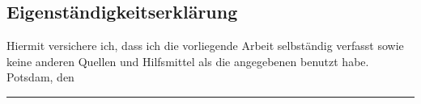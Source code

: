 \cleardoubleemptypage
\ifxetex
\begin{german}
\else
\begingroup
{}
\fi
  \setdatebynumber{\thedatenumber}
  \chapter*{Eigenständigkeitserklärung}
Hiermit versichere ich, dass ich die vorliegende Arbeit selbständig
verfasst sowie keine anderen Quellen und Hilfsmittel als die angegebenen
benutzt habe.\\[7\baselineskip]
%
  Potsdam, den \datedate \hfill \rule{.45\textwidth}{0.4pt}\par
%
  \raggedleft \makeatletter\@author\makeatother\par
\ifxetex
\end{german}
\else
\endgroup
\fi

